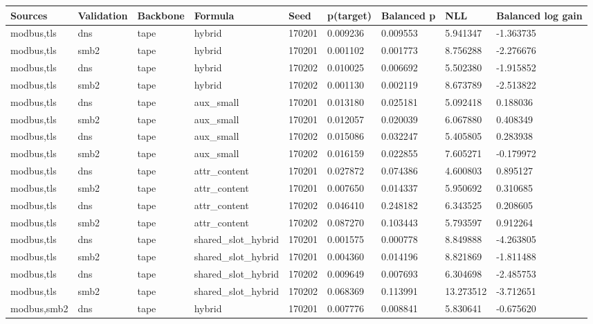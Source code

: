 \begin{tabular}{lllllllll}
\hline
Sources & Validation & Backbone & Formula & Seed & p(target) & Balanced p & NLL & Balanced log gain \\
\hline
modbus,tls & dns & tape & hybrid & 170201 & 0.009236 & 0.009553 & 5.941347 & -1.363735 \\
modbus,tls & smb2 & tape & hybrid & 170201 & 0.001102 & 0.001773 & 8.756288 & -2.276676 \\
modbus,tls & dns & tape & hybrid & 170202 & 0.010025 & 0.006692 & 5.502380 & -1.915852 \\
modbus,tls & smb2 & tape & hybrid & 170202 & 0.001130 & 0.002119 & 8.673789 & -2.513822 \\
modbus,tls & dns & tape & aux\_small & 170201 & 0.013180 & 0.025181 & 5.092418 & 0.188036 \\
modbus,tls & smb2 & tape & aux\_small & 170201 & 0.012057 & 0.020039 & 6.067880 & 0.408349 \\
modbus,tls & dns & tape & aux\_small & 170202 & 0.015086 & 0.032247 & 5.405805 & 0.283938 \\
modbus,tls & smb2 & tape & aux\_small & 170202 & 0.016159 & 0.022855 & 7.605271 & -0.179972 \\
modbus,tls & dns & tape & attr\_content & 170201 & 0.027872 & 0.074386 & 4.600803 & 0.895127 \\
modbus,tls & smb2 & tape & attr\_content & 170201 & 0.007650 & 0.014337 & 5.950692 & 0.310685 \\
modbus,tls & dns & tape & attr\_content & 170202 & 0.046410 & 0.248182 & 6.343525 & 0.208605 \\
modbus,tls & smb2 & tape & attr\_content & 170202 & 0.087270 & 0.103443 & 5.793597 & 0.912264 \\
modbus,tls & dns & tape & shared\_slot\_hybrid & 170201 & 0.001575 & 0.000778 & 8.849888 & -4.263805 \\
modbus,tls & smb2 & tape & shared\_slot\_hybrid & 170201 & 0.004360 & 0.014196 & 8.821869 & -1.811488 \\
modbus,tls & dns & tape & shared\_slot\_hybrid & 170202 & 0.009649 & 0.007693 & 6.304698 & -2.485753 \\
modbus,tls & smb2 & tape & shared\_slot\_hybrid & 170202 & 0.068369 & 0.113991 & 13.273512 & -3.712651 \\
modbus,smb2 & dns & tape & hybrid & 170201 & 0.007776 & 0.008841 & 5.830641 & -0.675620 \\

\end{tabular}
